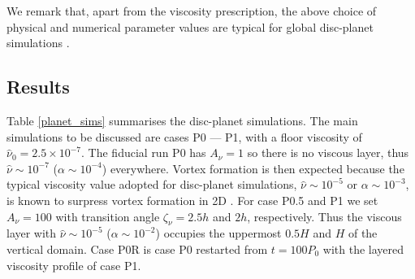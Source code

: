 We remark that, apart from the viscosity prescription, the above
choice of physical and numerical parameter values are typical for
global disc-planet simulations \citep[e.g.][]{valborro06,mignone12}.    







\subsection{Results}
Table \ref{planet_sims} summarises the disc-planet simulations. 
The main simulations to be discussed are cases P0 --- P1, with a floor
viscosity of $\hat{\nu}_0=2.5\times10^{-7}$. 
The fiducial run P0 has $A_\nu=1$ so there is no viscous layer, thus
$\hat{\nu}\sim 10^{-7}$ ($\alpha\sim 10^{-4}$) everywhere. Vortex
formation is then expected because the typical viscosity
value adopted for disc-planet simulations, $\hat{\nu}\sim 10^{-5}$ or
$\alpha\sim 10^{-3}$, is known to surpress vortex formation in 2D
\citep{valborro07, mudryk09}. 
For case P0.5 and P1 we set $A_\nu=100$ with transition angle $\zeta_\nu=2.5h$ and
$2h$, respectively. Thus the viscous layer with $\hat{\nu}\sim10^{-5}$
($\alpha\sim10^{-2}$) occupies the uppermost $0.5H$ and $H$ of the vertical
domain. %
Case P0R is case P0 restarted from 
$t=100P_0$ with the layered viscosity profile of case P1. 


 

 

